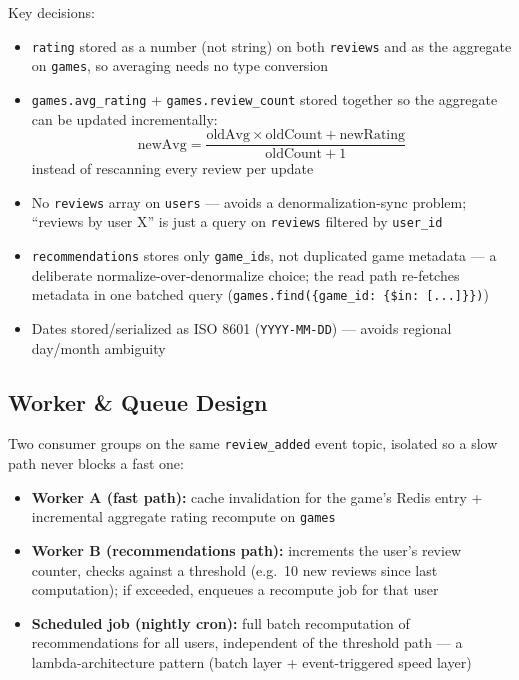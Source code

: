 \documentclass[11pt]{article}
\begin{document}
Key decisions:
\begin{itemize}[nosep]
    \item \texttt{rating} stored as a number (not string) on both \texttt{reviews} and as the aggregate on \texttt{games}, so averaging needs no type conversion
    \item \texttt{games.avg\_rating} + \texttt{games.review\_count} stored together so the aggregate can be updated incrementally:
    \[
        \text{newAvg} = \frac{\text{oldAvg} \times \text{oldCount} + \text{newRating}}{\text{oldCount} + 1}
    \]
    instead of rescanning every review per update
    \item No \texttt{reviews} array on \texttt{users} --- avoids a denormalization-sync problem; ``reviews by user X'' is just a query on \texttt{reviews} filtered by \texttt{user\_id}
    \item \texttt{recommendations} stores only \texttt{game\_id}s, not duplicated game metadata --- a deliberate normalize-over-denormalize choice; the read path re-fetches metadata in one batched query (\texttt{games.find(\{game\_id: \{\$in: [...]\}\})})
    \item Dates stored/serialized as ISO 8601 (\texttt{YYYY-MM-DD}) --- avoids regional day/month ambiguity
\end{itemize}

\subsection{Worker \& Queue Design}
\label{sec:worker-queue}

Two consumer groups on the same \texttt{review\_added} event topic, isolated so a slow path never blocks a fast one:

\begin{itemize}[nosep]
    \item \textbf{Worker A (fast path):} cache invalidation for the game's Redis entry + incremental aggregate rating recompute on \texttt{games}
    \item \textbf{Worker B (recommendations path):} increments the user's review counter, checks against a threshold (e.g.\ 10 new reviews since last computation); if exceeded, enqueues a recompute job for that user
    \item \textbf{Scheduled job (nightly cron):} full batch recomputation of recommendations for all users, independent of the threshold path --- a lambda-architecture pattern (batch layer + event-triggered speed layer)
\end{itemize}
\end{document}
